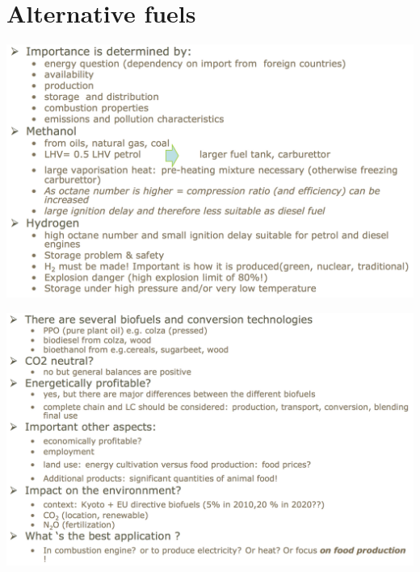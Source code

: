 	
\section{Alternative fuels}
	\begin{center}
	\begin{minipage}{0.49\textwidth}
	\includegraphics[scale=0.25]{ch3/8}
	\end{minipage}
	\begin{minipage}{0.49\textwidth}
	\includegraphics[scale=0.25]{ch3/9}
	\end{minipage}
	\end{center}














